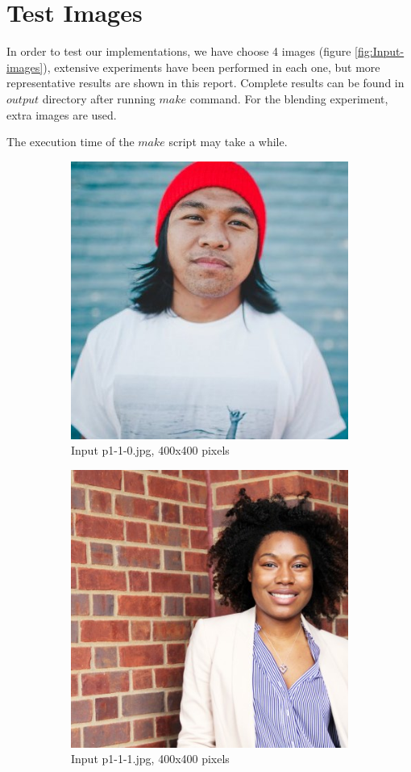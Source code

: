 \section{Test Images}

In order to test our implementations, we have choose 4 images (figure \ref{fig:Input-images}), extensive experiments have been performed in each one, but more representative results are shown in this report. Complete results can be found in $output$ directory after running $make$ command. For the blending experiment, extra images are used. 

The execution time of the $make$ script may take a while.

\begin{figure}[h!]
\centering
\begin{subfigure}{0.5\textwidth}
  \centering
  \includegraphics[width=0.5\linewidth]{input/p1-1-0.jpg}
  \caption{Input p1-1-0.jpg, 400x400 pixels}
\end{subfigure}%
\begin{subfigure}{0.5\textwidth}
  \centering
  \includegraphics[width=0.5\linewidth]{input/p1-1-1.jpg}
  \caption{Input p1-1-1.jpg, 400x400 pixels}
\end{subfigure}
\begin{subfigure}{0.5\textwidth}

\end{subfigure}
\end{figure}
